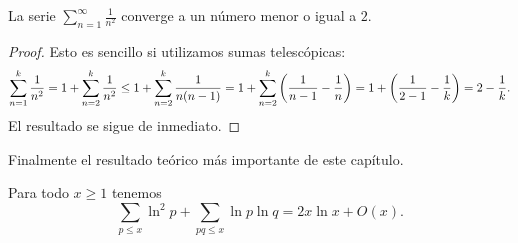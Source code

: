 \begin{lemma}
  \label{lem:sum-1-n2}
  La serie \(\displaystyle{\sum_{n = 1}^\infty \frac{1}{n ^ 2}}\)
  converge a un n\'umero menor o igual a \(2\).
\end{lemma}

\begin{proof}
  Esto es sencillo si utilizamos sumas telesc\'opicas: 
  \[
    \sum_{n = 1}^k \frac{1}{n^2}
    = 1 + \sum_{n = 2}^k \frac{1}{n^2} 
    \leq 1 + \sum_{n = 2}^k \frac{1}{n (n - 1)}
    = 1 + \sum_{n = 2}^k \left( \frac{1}{n - 1} - \frac{1}{n} \right)
    = 1 + \left( \frac{1}{2 - 1} - \frac{1}{k} \right)
    = 2 - \frac{1}{k}.
  \]
  El resultado se sigue de inmediato.
\end{proof}

Finalmente el resultado te\'orico m\'as importante de este cap\'itulo.

\begin{theorem}
  \label{thm:selberg}
  Para todo \(x \geq 1\) tenemos
  \[
    \sum_{p \leq x} \ln^2 p + \sum_{pq \leq x} \ln p \ln q = 2x\ln x + O(x).
  \]
\end{theorem}


